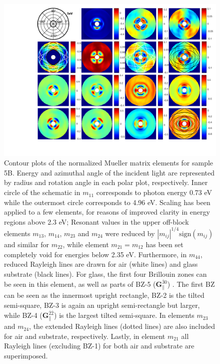 \begin{figure}[h]
    \label{fig:S5B_N@LSPR}
\end{figure}

\begin{figure}[h]  %
    \centering
    \includegraphics[width=\linewidth, trim=3cm 1cm 0.4cm 0cm, clip]{figures/ch4/S5B/contour/Muller_rot_S5B_COMSOLSIM_55_final(2).pdf}
    \caption{Contour plots of the normalized Mueller matrix elements for sample 5B. Energy and azimuthal angle of the incident light are represented by radius and rotation angle in each polar plot, respectively. Inner circle of the schematic in $m_{11}$ corresponds to photon energy 0.73 eV while the outermost circle corresponds to 4.96 eV. Scaling has been applied to a few elements, for reasons of improved clarity in energy regions above 2.3 eV; Resonant values in the upper off-block elements $m_{13}$, $m_{14}$, $m_{23}$ and $m_{24}$ were reduced by $|m_{ij}|^{1/4}\text{sign}(m_{ij})$ and similar for $m_{22}$, while element $m_{21}=m_{12}$ has been set completely void for energies below 2.35 eV. Furthermore, in $m_{44}$, reduced Rayleigh lines are drawn for air (white lines) and glass substrate (black lines). For glass, the first four Brillouin zones can be seen in this element, as well as parts of BZ-5 ($\mathbf{G}_\parallel^{\bar{3}0}$) . The first BZ can be seen as the innermost upright rectangle, BZ-2 is the tilted semi-square, BZ-3 is again an upright semi-rectangle but larger, while BZ-4  ($\mathbf{G}_\parallel^{\bar{2}\bar{2}}$) is the largest tilted semi-square. In elements $m_{23}$ and $m_{24}$, the extended Rayleigh lines (dotted lines) are also included for air and substrate, respectively. Lastly, in element $m_{21}$ all Rayleigh lines (excluding BZ-1) for both air and substrate are superimposed.} 
    \label{fig:S5B_contour_MM_exp}
\end{figure}

